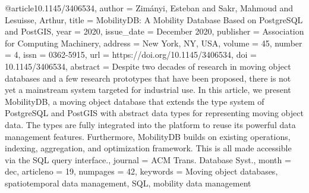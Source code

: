 @article{10.1145/3406534,
	author = {Zim\'{a}nyi, Esteban and Sakr, Mahmoud and Lesuisse, Arthur},
	title = {MobilityDB: A Mobility Database Based on PostgreSQL and PostGIS},
	year = {2020},
	issue_date = {December 2020},
	publisher = {Association for Computing Machinery},
	address = {New York, NY, USA},
	volume = {45},
	number = {4},
	issn = {0362-5915},
	url = {https://doi.org/10.1145/3406534},
	doi = {10.1145/3406534},
	abstract = {Despite two decades of research in moving object databases and a few research prototypes that have been proposed, there is not yet a mainstream system targeted for industrial use. In this article, we present MobilityDB, a moving object database that extends the type system of PostgreSQL and PostGIS with abstract data types for representing moving object data. The types are fully integrated into the platform to reuse its powerful data management features. Furthermore, MobilityDB builds on existing operations, indexing, aggregation, and optimization framework. This is all made accessible via the SQL query interface.},
	journal = {ACM Trans. Database Syst.},
	month = {dec},
	articleno = {19},
	numpages = {42},
	keywords = {Moving object databases, spatiotemporal data management, SQL, mobility data management}
}